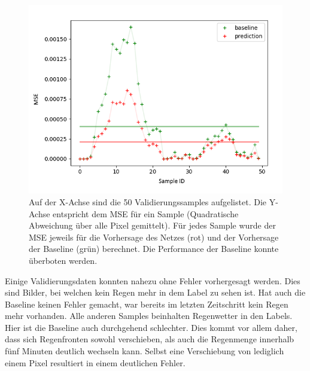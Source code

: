 \begin{figure}[h]
	\centering
	\includegraphics[width=\linewidth]{pics/mse_baseline}
	\caption[Vergleich zwischen Baseline und Netzvorhersage.]{Auf der X-Achse sind die 50 Validierungssamples aufgelistet. Die Y-Achse entspricht dem MSE für ein Sample (Quadratische Abweichung über alle Pixel gemittelt). Für jedes Sample wurde der MSE jeweils für die Vorhersage des Netzes (rot) und der Vorhersage der Baseline (grün) berechnet. Die Performance der Baseline konnte überboten werden.}
	\label{vglBaseline1}
\end{figure}

Einige Validierungsdaten konnten nahezu ohne Fehler vorhergesagt werden. Dies sind Bilder, bei welchen kein Regen mehr in dem Label zu sehen ist. Hat auch die Baseline keinen Fehler gemacht, war bereits im letzten Zeitschritt kein Regen mehr vorhanden. Alle anderen Samples beinhalten Regenwetter in den Labels. Hier ist die Baseline auch durchgehend schlechter. Dies kommt vor allem daher, dass sich Regenfronten sowohl verschieben, als auch die Regenmenge innerhalb fünf Minuten deutlich wechseln kann. Selbst eine Verschiebung von lediglich einem Pixel resultiert in einem deutlichen Fehler.

